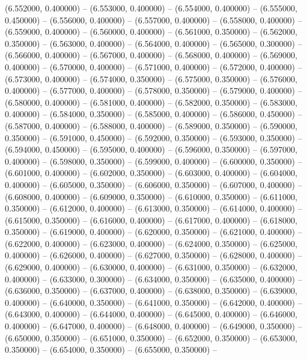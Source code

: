 (6.552000, 0.400000) -- 
(6.553000, 0.400000) -- 
(6.554000, 0.400000) -- 
(6.555000, 0.450000) -- 
(6.556000, 0.400000) -- 
(6.557000, 0.400000) -- 
(6.558000, 0.400000) -- 
(6.559000, 0.400000) -- 
(6.560000, 0.400000) -- 
(6.561000, 0.350000) -- 
(6.562000, 0.350000) -- 
(6.563000, 0.400000) -- 
(6.564000, 0.400000) -- 
(6.565000, 0.300000) -- 
(6.566000, 0.400000) -- 
(6.567000, 0.400000) -- 
(6.568000, 0.400000) -- 
(6.569000, 0.400000) -- 
(6.570000, 0.400000) -- 
(6.571000, 0.400000) -- 
(6.572000, 0.400000) -- 
(6.573000, 0.400000) -- 
(6.574000, 0.350000) -- 
(6.575000, 0.350000) -- 
(6.576000, 0.400000) -- 
(6.577000, 0.400000) -- 
(6.578000, 0.350000) -- 
(6.579000, 0.400000) -- 
(6.580000, 0.400000) -- 
(6.581000, 0.400000) -- 
(6.582000, 0.350000) -- 
(6.583000, 0.400000) -- 
(6.584000, 0.350000) -- 
(6.585000, 0.400000) -- 
(6.586000, 0.450000) -- 
(6.587000, 0.400000) -- 
(6.588000, 0.400000) -- 
(6.589000, 0.350000) -- 
(6.590000, 0.350000) -- 
(6.591000, 0.450000) -- 
(6.592000, 0.350000) -- 
(6.593000, 0.350000) -- 
(6.594000, 0.450000) -- 
(6.595000, 0.400000) -- 
(6.596000, 0.350000) -- 
(6.597000, 0.400000) -- 
(6.598000, 0.350000) -- 
(6.599000, 0.400000) -- 
(6.600000, 0.350000) -- 
(6.601000, 0.400000) -- 
(6.602000, 0.350000) -- 
(6.603000, 0.400000) -- 
(6.604000, 0.400000) -- 
(6.605000, 0.350000) -- 
(6.606000, 0.350000) -- 
(6.607000, 0.400000) -- 
(6.608000, 0.400000) -- 
(6.609000, 0.350000) -- 
(6.610000, 0.350000) -- 
(6.611000, 0.350000) -- 
(6.612000, 0.400000) -- 
(6.613000, 0.350000) -- 
(6.614000, 0.400000) -- 
(6.615000, 0.350000) -- 
(6.616000, 0.400000) -- 
(6.617000, 0.400000) -- 
(6.618000, 0.350000) -- 
(6.619000, 0.400000) -- 
(6.620000, 0.350000) -- 
(6.621000, 0.400000) -- 
(6.622000, 0.400000) -- 
(6.623000, 0.400000) -- 
(6.624000, 0.350000) -- 
(6.625000, 0.400000) -- 
(6.626000, 0.400000) -- 
(6.627000, 0.350000) -- 
(6.628000, 0.400000) -- 
(6.629000, 0.400000) -- 
(6.630000, 0.400000) -- 
(6.631000, 0.350000) -- 
(6.632000, 0.400000) -- 
(6.633000, 0.300000) -- 
(6.634000, 0.350000) -- 
(6.635000, 0.400000) -- 
(6.636000, 0.350000) -- 
(6.637000, 0.400000) -- 
(6.638000, 0.350000) -- 
(6.639000, 0.400000) -- 
(6.640000, 0.350000) -- 
(6.641000, 0.350000) -- 
(6.642000, 0.400000) -- 
(6.643000, 0.400000) -- 
(6.644000, 0.400000) -- 
(6.645000, 0.400000) -- 
(6.646000, 0.400000) -- 
(6.647000, 0.400000) -- 
(6.648000, 0.400000) -- 
(6.649000, 0.350000) -- 
(6.650000, 0.350000) -- 
(6.651000, 0.350000) -- 
(6.652000, 0.350000) -- 
(6.653000, 0.350000) -- 
(6.654000, 0.350000) -- 
(6.655000, 0.350000) -- 
